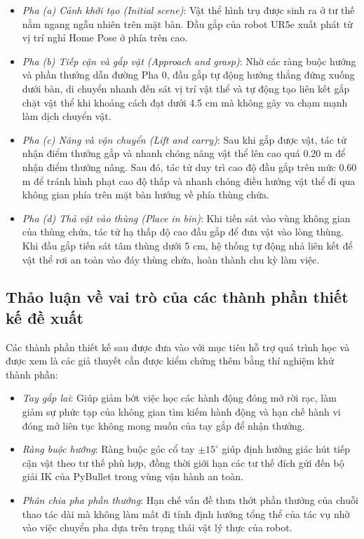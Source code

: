 \documentclass[conference]{IEEEtran}
\begin{document}
\begin{itemize}
    \item \textit{Pha (a) Cảnh khởi tạo (Initial scene)}: Vật thể hình trụ được sinh ra ở tư thế nằm ngang ngẫu nhiên trên mặt bàn. Đầu gắp của robot UR5e xuất phát từ vị trí nghỉ Home Pose ở phía trên cao.
    \item \textit{Pha (b) Tiếp cận và gắp vật (Approach and grasp)}: Nhờ các ràng buộc hướng và phần thưởng dẫn đường Pha 0, đầu gắp tự động hướng thẳng đứng xuống dưới bàn, di chuyển nhanh đến sát vị trí vật thể và tự động tạo liên kết gắp chặt vật thể khi khoảng cách đạt dưới 4.5 cm mà không gây va chạm mạnh làm dịch chuyển vật.
    \item \textit{Pha (c) Nâng và vận chuyển (Lift and carry)}: Sau khi gắp được vật, tác tử nhận điểm thưởng gắp và nhanh chóng nâng vật thể lên cao quá 0.20 m để nhận điểm thưởng nâng. Sau đó, tác tử duy trì cao độ đầu gắp trên mức 0.60 m để tránh hình phạt cao độ thấp và nhanh chóng điều hướng vật thể đi qua không gian phía trên mặt bàn hướng về phía thùng chứa.
    \item \textit{Pha (d) Thả vật vào thùng (Place in bin)}: Khi tiến sát vào vùng không gian của thùng chứa, tác tử hạ thấp độ cao đầu gắp để đưa vật vào lòng thùng. Khi đầu gắp tiến sát tâm thùng dưới 5 cm, hệ thống tự động nhả liên kết để vật thể rơi an toàn vào đáy thùng chứa, hoàn thành chu kỳ làm việc.
\end{itemize}

\subsection{Thảo luận về vai trò của các thành phần thiết kế đề xuất}
Các thành phần thiết kế sau được đưa vào với mục tiêu hỗ trợ quá trình học và được xem là các giả thuyết cần được kiểm chứng thêm bằng thí nghiệm khử thành phần:
\begin{itemize}
    \item \textit{Tay gắp lai}: Giúp giảm bớt việc học các hành động đóng mở rời rạc, làm giảm sự phức tạp của không gian tìm kiếm hành động và hạn chế hành vi đóng mở liên tục không mong muốn của tay gắp để nhận thưởng.
    \item \textit{Ràng buộc hướng}: Ràng buộc góc cổ tay $\pm15^\circ$ giúp định hướng giác hút tiếp cận vật theo tư thế phù hợp, đồng thời giới hạn các tư thế đích gửi đến bộ giải IK của PyBullet trong vùng vận hành an toàn.
    \item \textit{Phân chia pha phần thưởng}: Hạn chế vấn đề thưa thớt phần thưởng của chuỗi thao tác dài mà không làm mất đi tính định hướng tổng thể của tác vụ nhờ vào việc chuyển pha dựa trên trạng thái vật lý thực của robot.
\end{itemize}
\end{document}

